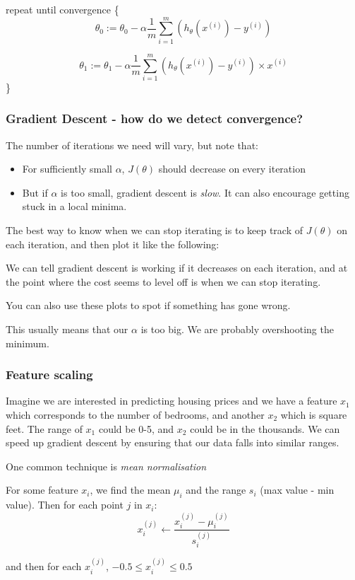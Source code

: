 \documentclass[11pt]{article}
\begin{document}
    repeat until convergence \{
    \[\theta_0 := \theta_0 - \alpha \frac{1}{m} \sum^m_{i=1} (h_\theta(x^{(i)}) - y^{(i)} )\]

    \[\theta_1 := \theta_1 - \alpha \frac{1}{m} \sum^m_{i=1} (h_\theta(x^{(i)}) - y^{(i)}) \times x^{(i)}\]
    \}

    \subsubsection{Gradient Descent - how do we detect convergence?}

    The number of iterations we need will vary, but note that:
    \begin{itemize}
        \item For sufficiently small $\alpha$, $J(\theta)$ should decrease on every iteration
        \item But if $\alpha$ is too small, gradient descent is \textit{slow}. It can also encourage getting stuck in a local minima.
    \end{itemize}

    The best way to know when we can stop iterating is to keep track of $J(\theta)$ on each iteration, and then plot it like the following:


    We can tell gradient descent is working if it decreases on each iteration, and at the point where the cost seems to level off is when we can stop iterating.

    You can also use these plots to spot if something has gone wrong.


    This usually means that our $\alpha$ is too big. We are probably overshooting the minimum.

    \subsubsection{Feature scaling}

    Imagine we are interested in predicting housing prices and we have a feature $x_1$ which corresponds to the number of bedrooms, and another $x_2$ which is square feet. The range of $x_1$ could be 0-5, and $x_2$ could be in the thousands. We can speed up gradient descent by ensuring that our data falls into similar ranges.

    One common technique is \textit{mean normalisation}

    For some feature $x_i$, we find the mean $\mu_i$ and the range $s_i$ (max value - min value). Then for each point $j$ in $x_i$:
    \[
        x_i^{(j)} \leftarrow \frac{x_i^{(j)} - \mu_i^{(j)}}{s_i^{(j)}}
    \]

    and then for each $x_i^{(j)} $, $-0.5 \leq x_i^{(j)}  \leq 0.5$
\end{document}
